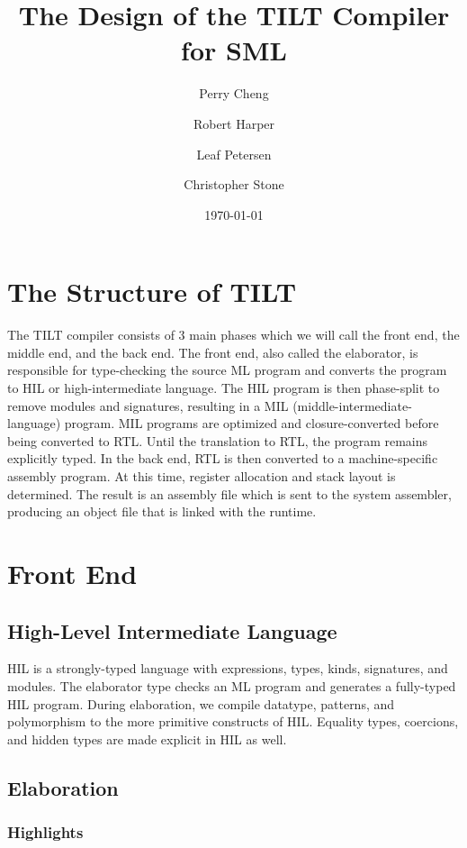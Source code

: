 \documentclass[12pt,twoside]{article}
\begin{document}
\title{The Design of the TILT Compiler for SML}
\author{Perry Cheng\and Robert Harper\and 
        Leaf Petersen\and Christopher Stone}
\date{\today}

\section{The Structure of TILT}

The TILT compiler consists of 3 main phases which we will call the
front end, the middle end, and the back end.  The front end, also
called the elaborator, is responsible for type-checking the source ML
program and converts the program to HIL or high-intermediate language.
The HIL program is then phase-split to remove modules and signatures,
resulting in a MIL (middle-intermediate-language) program.  MIL
programs are optimized and closure-converted before being converted to
RTL.  Until the translation to RTL, the program remains explicitly
typed.  In the back end, RTL is then converted to a machine-specific
assembly program.  At this time, register allocation and stack layout
is determined.  The result is an assembly file which is sent to the
system assembler, producing an object file that is linked with the
runtime.

\section{Front End}

\subsection{High-Level Intermediate Language}

HIL is a strongly-typed language with expressions, types, kinds,
signatures, and modules.  The elaborator type checks an ML program and
generates a fully-typed HIL program.  During elaboration, we compile
datatype, patterns, and polymorphism to the more primitive constructs
of HIL.  Equality types, coercions, and hidden types are made explicit
in HIL as well.

\subsection{Elaboration}



\subsubsection{Highlights}
\end{document}
